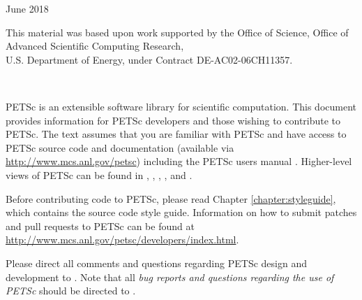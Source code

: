 \vspace*{30pt}
\noindent June 2018

\vspace*{20pt}
\noindent This material was based upon work supported by the Office of Science, Office of Advanced Scientific Computing Research, \\
U.S. Department of Energy, under Contract DE-AC02-06CH11357.


\newpage

\hbox{ }

\vspace{1in}
\date{\today}

\pagestyle{empty}
\newpage

\medskip \medskip

%
%

\medskip \medskip
PETSc is an extensible software library for scientific
computation. This document provides information for PETSc
developers and those wishing to contribute to PETSc. The text assumes
that you are familiar with PETSc and have access to PETSc source code
and documentation (available
via \href{http://www.mcs.anl.gov/petsc}{http://www.mcs.anl.gov/petsc}) including the PETSc users manual \cite{petsc-user-ref}.
Higher-level views of PETSc can be found in \cite{s2011}, \cite{bgms00}, \cite{miss-paper}, \cite{bgms98}, and \cite{petsc-efficient}. 

Before contributing code to PETSc, please read Chapter \ref{chapter:styleguide}, which contains the source code style guide.
Information on how to submit patches and pull requests to PETSc can be found at
\href{http://www.mcs.anl.gov/petsc/developers/index.html}{http://www.mcs.anl.gov/petsc/developers/index.html}.

\vspace{1cm}

Please direct all comments and questions regarding PETSc design and
development to .  Note that all {\em
bug reports and questions regarding the use of PETSc} should
be directed to .

%
%

